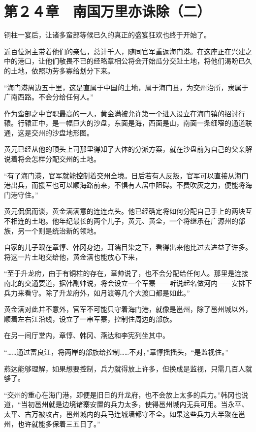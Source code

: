 \section{第２４章　南国万里亦诛除（二）}

铜柱一宴后，让诸多蛮部等候已久的真正的盛宴狂欢也终于开始了。

近百位洞主带着他们的亲信，总计千人，随同官军重返海门港。在这座正在兴建之中的港口，让他们敬畏不已的经略章相公将会开始瓜分交趾土地，将他们渴盼已久的土地，依照功劳多寡给划分下来。

“海门港周边五十里，这是直属于中国的土地，属于海门县，为交州治所，隶属于广南西路。不会分给任何人。”

作为蛮部之中官职最高的一人，黄金满被允许第一个进入设立在海门镇的招讨行辕。行辕正中，是一幅巨大的沙盘，东面是海，西面是山，南面一条细窄的通道联通，这是交州的沙盘地形图。

黄元已经从他的顶头上司那里得知了大体的分派方案，就在沙盘前为自己的父亲解说着将会怎样分配交州的土地。

“有了海门港，官军就能控制着交州全境。日后若有人反叛，官军可以直接从海门港出兵，而援军也可以顺海路前来，不惧有人居中阻碍。不费吹灰之力，便能将海门港守住。”

黄元侃侃而谈，黄金满满意的连连点头。他已经确定将如何分配自己手上的两块互不相连的土地。他年纪最长的两个儿子，黄元、黄全，一个将继承在广源州的部族，另一个则是统治新的领地。

自家的儿子跟在章惇、韩冈身边，耳濡目染之下，看得出来他比过去进益了许多。将这一片土地交给他，黄金满也能放心下来，

“至于升龙府，由于有铜柱的存在，章帅说了，也不会分配给任何人。那里是连接南北的交通要道，据韩副帅说，将会设立一个军寨——听说起名做河内——安排下兵力来看守。除了升龙府外，如月渡等几个大渡口都是如此。”

黄金满对此并不意外，官军不可能只守着海门港，就像是邕州，除了邕州城以外，顺着左右江沿线，设立了一串军寨，控制住周边的部族。

在另一间厅堂内，章惇、韩冈、燕达和李宪列坐其中。

“……通过富良江，将两岸的部族给控制……不对，”章惇摇摇头，“是监视住。”

燕达能够理解，如果想要控制，兵力就得放上许多，但换成是监视，只需几百人就够了。

“交州的重心在海门港，即便是旧日的升龙府，也不会放上太多的兵力。”韩冈也说道，“当初邕州就是边境诸寨安置的兵力太多，使得邕州城内无兵可用。当永平、太平、古万被攻占，邕州城内的兵马连城墙都守不全。如果这些兵力大半聚在邕州，也许就能多保着三五日了。”

